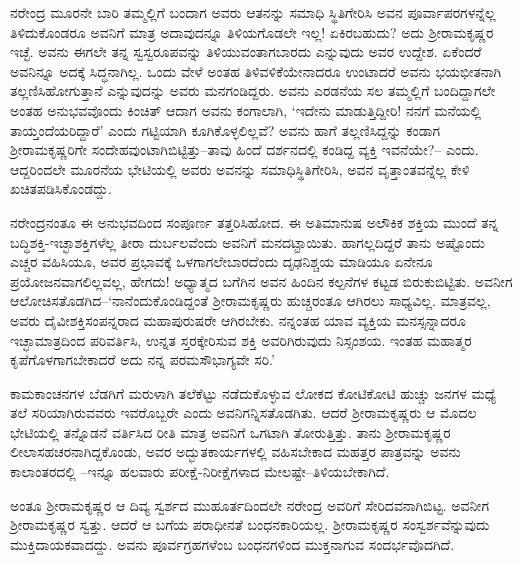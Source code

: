 ನರೇಂದ್ರ ಮೂರನೇ ಬಾರಿ ತಮ್ಮಲ್ಲಿಗೆ ಬಂದಾಗ ಅವರು ಆತನನ್ನು ಸಮಾಧಿ ಸ್ಥಿತಿಗೇರಿಸಿ ಅವನ ಪೂರ್ವಾಪರಗಳನ್ನೆಲ್ಲ ತಿಳಿದುಕೊಂಡರೂ ಅವನಿಗೆ ಮಾತ್ರ ಅದಾವುದನ್ನೂ ತಿಳಿಯಗೊಡಲೇ ಇಲ್ಲ! ಏಕಿರಬಹುದು? ಅದು ಶ್ರೀರಾಮಕೃಷ್ಣರ ಇಚ್ಛೆ. ಅವನು ಈಗಲೇ ತನ್ನ ಸ್ವಸ್ವರೂಪವನ್ನು ತಿಳಿಯುವಂತಾಗಬಾರದು ಎನ್ನುವುದು ಅವರ ಉದ್ದೇಶ. ಏಕೆಂದರೆ ಅವನಿನ್ನೂ ಅದಕ್ಕೆ ಸಿದ್ಧನಾಗಿಲ್ಲ. ಒಂದು ವೇಳೆ ಅಂತಹ ತಿಳಿವಳಿಕೆಯೇನಾದರೂ ಉಂಟಾದರೆ ಅವನು ಭಯಭೀತನಾಗಿ ತಲ್ಲಣಿಸಿಹೋಗುತ್ತಾನೆ ಎನ್ನುವುದನ್ನು ಅವರು ಮನಗಂಡಿದ್ದರು. ಅವನು ಎರಡನೆಯ ಸಲ ತಮ್ಮಲ್ಲಿಗೆ ಬಂದಿದ್ದಾಗಲೇ ಅಂತಹ ಅನುಭವವೊಂದು ಕಿಂಚಿತ್ ಆದಾಗ ಅವನು ಕಂಗಾಲಾಗಿ, ‘ಇದೇನು ಮಾಡುತ್ತಿದ್ದೀರಿ! ನನಗೆ ಮನೆಯಲ್ಲಿ ತಾಯ್ತಂದೆಯರಿದ್ದಾರೆ’ ಎಂದು ಗಟ್ಟಿಯಾಗಿ ಕೂಗಿಕೊಳ್ಳಲಿಲ್ಲವೆ? ಅವನು ಹಾಗೆ ತಲ್ಲಣಿಸಿದ್ದನ್ನು ಕಂಡಾಗ ಶ್ರೀರಾಮಕೃಷ್ಣರಿಗೇ ಸಂದೇಹವುಂಟಾಗಿಬಿಟ್ಟಿತ್ತು–ತಾವು ಹಿಂದೆ ದರ್ಶನದಲ್ಲಿ ಕಂಡಿದ್ದ ವ್ಯಕ್ತಿ ಇವನೆಯೇ?– ಎಂದು. ಆದ್ದರಿಂದಲೇ ಮೂರನೆಯ ಭೇಟಿಯಲ್ಲಿ ಅವರು ಅವನನ್ನು ಸಮಾಧಿಸ್ಥಿತಿಗೇರಿಸಿ, ಅವನ ವೃತ್ತಾಂತವನ್ನೆಲ್ಲ ಕೇಳಿ ಖಚಿತಪಡಿಸಿಕೊಂಡದ್ದು.

ನರೇಂದ್ರನಂತೂ ಈ ಅನುಭವದಿಂದ ಸಂಪೂರ್ಣ ತತ್ತರಿಸಿಹೋದ. ಈ ಅತಿಮಾನುಷ ಅಲೌಕಿಕ ಶಕ್ತಿಯ ಮುಂದೆ ತನ್ನ ಬದ್ಧಿಶಕ್ತಿ-ಇಚ್ಛಾಶಕ್ತಿಗಳೆಲ್ಲ ತೀರಾ ದುರ್ಬಲವೆಂದು ಅವನಿಗೆ ಮನದಟ್ಟಾಯಿತು. ಹಾಗಲ್ಲದಿದ್ದರೆ ತಾನು ಅಷ್ಟೊಂದು ಎಚ್ಚರ ವಹಿಸಿಯೂ, ಅವರ ಪ್ರಭಾವಕ್ಕೆ ಒಳಗಾಗಲೇಬಾರದೆಂದು ದೃಢನಿಶ್ಚಯ ಮಾಡಿಯೂ ಏನೇನೂ ಪ್ರಯೋಜನವಾಗಲಿಲ್ಲವಲ್ಲ, ಹೇಗದು! ಅಧ್ಯಾತ್ಮದ ಬಗೆಗಿನ ಅವನ ಹಿಂದಿನ ಕಲ್ಪನೆಗಳ ಕಟ್ಟಡ ಬಿರುಕುಬಿಟ್ಟಿತು. ಅವನೀಗ ಆಲೋಚಿಸತೊಡಗಿದ–‘ನಾನೆಂದುಕೊಂಡಿದ್ದಂತೆ ಶ್ರೀರಾಮಕೃಷ್ಣರು ಹುಚ್ಚರಂತೂ ಆಗಿರಲು ಸಾಧ್ಯವಿಲ್ಲ. ಮಾತ್ರವಲ್ಲ, ಅವರು ದೈವೀಶಕ್ತಿಸಂಪನ್ನರಾದ ಮಹಾಪುರುಷರೇ ಆಗಿರಬೇಕು. ನನ್ನಂತಹ ಯಾವ ವ್ಯಕ್ತಿಯ ಮನಸ್ಸನ್ನಾದರೂ ಇಚ್ಛಾಮಾತ್ರದಿಂದ ಪರಿವರ್ತಿಸಿ, ಉನ್ನತ ಸ್ತರಕ್ಕೇರಿಸುವ ಶಕ್ತಿ ಅವರಿಗಿರುವುದು ನಿಸ್ಸಂಶಯ. ಇಂತಹ ಮಹಾತ್ಮರ ಕೃಪೆಗೊಳಗಾಗಬೇಕಾದರೆ ಅದು ನನ್ನ ಪರಮಸೌಭಾಗ್ಯವೇ ಸರಿ.’

ಕಾಮಕಾಂಚನಗಳ ಬೆಡಗಿಗೆ ಮರುಳಾಗಿ ತಲೆಕೆಟ್ಟು ನಡೆದುಕೊಳ್ಳುವ ಲೋಕದ ಕೋಟಿಕೋಟಿ ಹುಚ್ಚು ಜನಗಳ ಮಧ್ಯೆ ತಲೆ ಸರಿಯಾಗಿರುವವರು ಇವರೊಬ್ಬರೇ ಎಂದು ಅವನಿಗನ್ನಿಸತೊಡಗಿತು. ಆದರೆ ಶ್ರೀರಾಮಕೃಷ್ಣರು ಆ ಮೊದಲ ಭೇಟಿಯಲ್ಲಿ ತನ್ನೊಡನೆ ವರ್ತಿಸಿದ ರೀತಿ ಮಾತ್ರ ಅವನಿಗೆ ಒಗಟಾಗಿ ತೋರುತ್ತಿತ್ತು. ತಾನು ಶ್ರೀರಾಮಕೃಷ್ಣರ ಲೀಲಾಸಹಚರನಾಗಿದ್ದಕೊಂಡು, ಅವರ ಅದ್ಭುತಕಾರ್ಯಗಳಲ್ಲಿ ವಹಿಸಬೇಕಾದ ಮಹತ್ತರ ಪಾತ್ರವನ್ನು ಅವನು ಕಾಲಾಂತರದಲ್ಲಿ –ಇನ್ನೂ ಹಲವಾರು ಪರೀಕ್ಷೆ-ನಿರೀಕ್ಷೆಗಳಾದ ಮೇಲಷ್ಟೇ–ತಿಳಿಯಬೇಕಾಗಿದೆ.

ಅಂತೂ ಶ್ರೀರಾಮಕೃಷ್ಣರ ಆ ದಿವ್ಯ ಸ್ವರ್ಶದ ಮುಹೂರ್ತದಿಂದಲೇ ನರೇಂದ್ರ ಅವರಿಗೆ ಸೇರಿದವನಾಗಿಬಿಟ್ಟ. ಅವನೀಗ ಶ್ರೀರಾಮಕೃಷ್ಣರ ಸ್ವತ್ತು. ಆದರೆ ಆ ಬಗೆಯ ಪರಾಧೀನತೆ ಬಂಧನಕಾರಿಯಲ್ಲ. ಶ್ರೀರಾಮಕೃಷ್ಣರ ಸಂಸ್ವರ್ಶವೆನ್ನುವುದು ಮುಕ್ತಿದಾಯಕವಾದದ್ದು. ಅವನು ಪೂರ್ವಗ್ರಹಗಳೆಂಬ ಬಂಧನಗಳಿಂದ ಮುಕ್ತನಾಗುವ ಸಂದರ್ಭವೊದಗಿದೆ.

